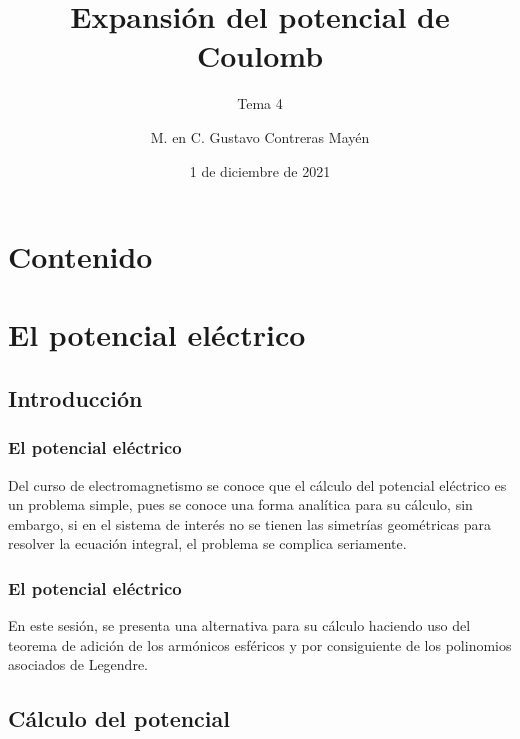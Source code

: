 \documentclass[12pt]{beamer}
\title{Expansión del potencial de Coulomb}
\subtitle{Tema 4}
\author{M. en C. Gustavo Contreras Mayén}
\date{1 de diciembre de 2021}
\begin{document}
\maketitle
\fontsize{14}{14}\selectfont
{}

\section*{Contenido}


\section{El potencial eléctrico}
\subsection{Introducción}

\begin{frame}
\frametitle{El potencial eléctrico}
Del curso de electromagnetismo se conoce que el cálculo del potencial eléctrico es un problema simple, pues se conoce una forma analítica para su cálculo, \pause sin embargo, si en el sistema de interés no se tienen las simetrías geométricas para resolver la ecuación integral, el problema se complica seriamente.
\end{frame}
\begin{frame}
\frametitle{El potencial eléctrico}
En este sesión, se presenta una alternativa para su cálculo haciendo uso del teorema de adición de los armónicos esféricos y por consiguiente de los polinomios asociados de Legendre.
\end{frame}

\subsection{Cálculo del potencial}
\end{document}
